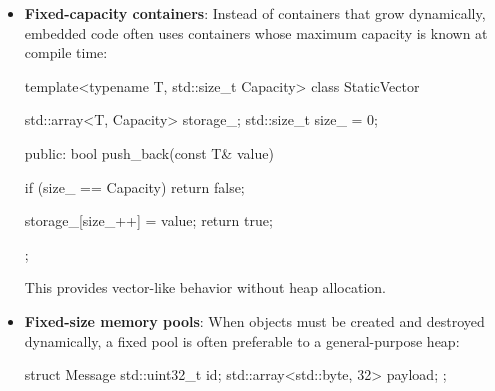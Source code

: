 \documentclass{report}
\begin{document}
\begin{itemize}
\begin{cppcode}
{                    parser.process();
                }
            \end{cppcode}
            \bigbreak \noindent 
            The compiler adjusts the stack pointer when the function begins and restores it when the function returns. There is no allocator involved, so allocation is fast and deterministic. 
            \bigbreak \noindent 
            However, MCU stacks are limited. Avoid putting very large buffers on the stack:
            \bigbreak \noindent 
            Large buffers are generally better placed in static storage or a deliberately managed memory region.
        \item \textbf{Fixed-capacity containers}: Instead of containers that grow dynamically, embedded code often uses containers whose maximum capacity is known at compile time:
            \bigbreak \noindent 
            \begin{cppcode}
                template<typename T, std::size_t Capacity>
                class StaticVector {
                    std::array<T, Capacity> storage_;
                    std::size_t size_ = 0;

                    public:
                    bool push_back(const T& value)
                    {
                        if (size_ == Capacity)
                        return false;

                        storage_[size_++] = value;
                        return true;
                    }
                };
            \end{cppcode}
            This provides vector-like behavior without heap allocation.
            \bigbreak \noindent 
        \item \textbf{Fixed-size memory pools}: When objects must be created and destroyed dynamically, a fixed pool is often preferable to a general-purpose heap:
            \bigbreak \noindent 
            \begin{cppcode}
                struct Message {
                    std::uint32_t id;
                    std::array<std::byte, 32> payload;
                };


\end{cppcode}
\end{itemize}
\end{document}

